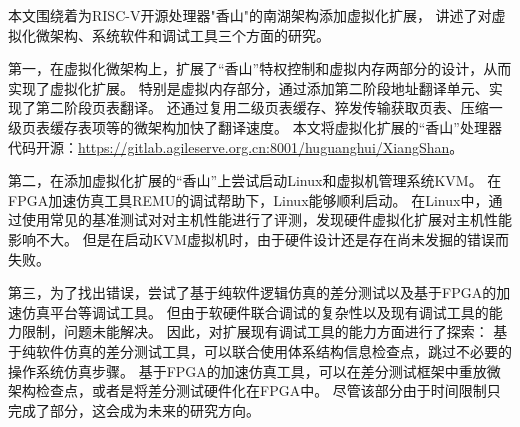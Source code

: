 \begin{conclusions}

本文围绕着为RISC-V开源处理器"香山"的南湖架构添加虚拟化扩展，
讲述了对虚拟化微架构、系统软件和调试工具三个方面的研究。

第一，在虚拟化微架构上，扩展了“香山”特权控制和虚拟内存两部分的设计，从而实现了虚拟化扩展。
特别是虚拟内存部分，通过添加第二阶段地址翻译单元、实现了第二阶段页表翻译。
还通过复用二级页表缓存、猝发传输获取页表、压缩一级页表缓存表项等的微架构加快了翻译速度。
本文将虚拟化扩展的“香山”处理器代码开源：\url{https://gitlab.agileserve.org.cn:8001/huguanghui/XiangShan}。

第二，在添加虚拟化扩展的“香山”上尝试启动Linux和虚拟机管理系统KVM。
在FPGA加速仿真工具REMU的调试帮助下，Linux能够顺利启动。
在Linux中，通过使用常见的基准测试对对主机性能进行了评测，发现硬件虚拟化扩展对主机性能影响不大。
但是在启动KVM虚拟机时，由于硬件设计还是存在尚未发掘的错误而失败。

第三，为了找出错误，尝试了基于纯软件逻辑仿真的差分测试以及基于FPGA的加速仿真平台等调试工具。
但由于软硬件联合调试的复杂性以及现有调试工具的能力限制，问题未能解决。
因此，对扩展现有调试工具的能力方面进行了探索：
基于纯软件仿真的差分测试工具，可以联合使用体系结构信息检查点，跳过不必要的操作系统仿真步骤。
基于FPGA的加速仿真工具，可以在差分测试框架中重放微架构检查点，或者是将差分测试硬件化在FPGA中。
尽管该部分由于时间限制只完成了部分，这会成为未来的研究方向。

\end{conclusions}
